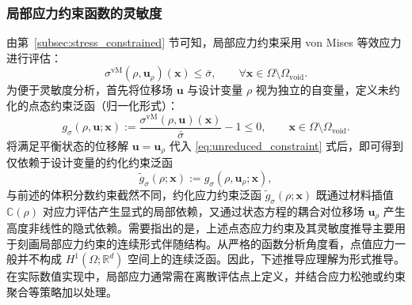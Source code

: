\subsubsection*{局部应力约束函数的灵敏度}

由第~\ref{subsec:stress_constrained} 节可知，局部应力约束采用 von Mises 等效应力进行评估：
\[
\sigma^{\mathrm{vM}}(\rho, \boldsymbol{u}_\rho)(\boldsymbol{x}) \le \bar{\sigma}, \qquad  \forall \boldsymbol{x}\in \Omega\setminus\Omega_{\mathrm{void}}.
\]
为便于灵敏度分析，首先将位移场 $\boldsymbol{u}$ 与设计变量 $\rho$ 视为独立的自变量，定义未约化的点态约束泛函（归一化形式）：
\begin{equation}
	g_\sigma(\rho, \boldsymbol{u}; \boldsymbol{x}) := \frac{\sigma^{\mathrm{vM}}(\rho, \boldsymbol{u})(\boldsymbol{x})}{\bar{\sigma}} - 1 \le 0, \qquad \boldsymbol{x}\in \Omega\setminus\Omega_{\mathrm{void}}.
	\label{eq:unreduced_constraint}
\end{equation}
将满足平衡状态的位移解 $\boldsymbol{u} = \boldsymbol{u}_\rho$ 代入 \eqref{eq:unreduced_constraint} 式后，即可得到仅依赖于设计变量的约化约束泛函
\[
\tilde g_\sigma(\rho;\boldsymbol{x}) := g_\sigma(\rho,\boldsymbol{u}_\rho;\boldsymbol{x}),
\]
与前述的体积分数约束截然不同，约化应力约束泛函 $\tilde{g}_\sigma(\rho; \boldsymbol{x})$ 既通过材料插值 $\mathbb{C}(\rho)$ 对应力评估产生显式的局部依赖，又通过状态方程的耦合对位移场 $\boldsymbol{u}_\rho$ 产生高度非线性的隐式依赖。需要指出的是，上述点态应力约束及其灵敏度推导主要用于刻画局部应力约束的连续形式伴随结构。从严格的函数分析角度看，点值应力一般并不构成 $H^1(\Omega;\mathbb{R}^d)$ 空间上的连续泛函。因此，下述推导应理解为形式推导。在实际数值实现中，局部应力通常需在离散评估点上定义，并结合应力松弛或约束聚合等策略加以处理。

